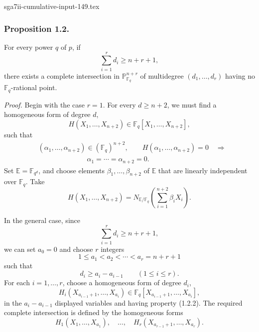 \begin{filecontents*}{sga7ii-cumulative-input-149.tex}
\subsubsection*{Proposition 1.2.}
For every power $q$ of $p$, if
\begin{equation*}
\sum_{i=1}^{r}d_i\geq n+r+1,
\end{equation*}
there exists a complete intersection in $\mathbb P^{n+r}_{\mathbb F_q}$ of
multidegree $(d_1,\dots,d_r)$ having no $\mathbb F_q$-rational point.

\medskip
\noindent\emph{Proof.}
Begin with the case $r=1$.  For every $d\geq n+2$, we must find a
homogeneous form of degree $d$,
\begin{equation}\tag{1.2.1}
H(X_1,\dots,X_{n+2})\in
\mathbb F_q[X_1,\dots,X_{n+2}],
\end{equation}
such that
\begin{equation}\tag{1.2.2}
\begin{aligned}
&(\alpha_1,\dots,\alpha_{n+2})\in(\mathbb F_q)^{n+2},\qquad
H(\alpha_1,\dots,\alpha_{n+2})=0\quad\Longrightarrow\\
&\hspace{7em}\alpha_1=\cdots=\alpha_{n+2}=0.
\end{aligned}
\end{equation}
Set $\mathbb E=\mathbb F_{q^d}$, and choose elements
$\beta_1,\dots,\beta_{n+2}$ of $\mathbb E$ that are linearly independent
over $\mathbb F_q$.  Take
\begin{equation}\tag{1.2.3}
H(X_1,\dots,X_{n+2})=
N_{\mathbb E/\mathbb F_q}
\left(\sum_{i=1}^{n+2}\beta_iX_i\right).
\end{equation}

In the general case, since
\begin{equation}\tag{1.2.4}
\sum_{i=1}^{r}d_i\geq n+r+1,
\end{equation}
we can set $a_0=0$ and choose $r$ integers
\begin{equation}\tag{1.2.5}
1\leq a_1<a_2<\cdots<a_r=n+r+1
\end{equation}
such that
\begin{equation}\tag{1.2.6}
d_i\geq a_i-a_{i-1}\qquad(1\leq i\leq r).
\end{equation}
For each $i=1,\dots,r$, choose a homogeneous form of degree $d_i$,
\begin{equation*}
H_i(X_{a_{i-1}+1},\dots,X_{a_i})
\in\mathbb F_q[X_{a_{i-1}+1},\dots,X_{a_i}],
\end{equation*}
in the $a_i-a_{i-1}$ displayed variables and having property (1.2.2).
The required complete intersection is defined by the homogeneous forms
\begin{equation*}
H_1(X_1,\dots,X_{a_1}),\quad\dots,\quad
H_r(X_{a_{r-1}+1},\dots,X_{a_r}).
\end{equation*}


\end{filecontents*}
